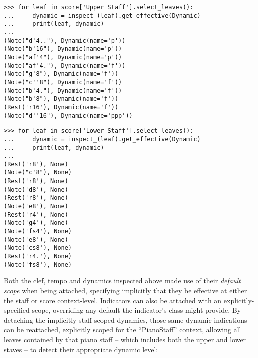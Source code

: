 \begin{comment}
<abjad>
for leaf in score['Upper Staff'].select_leaves():
    dynamic = inspect_(leaf).get_effective(Dynamic)
    print(leaf, dynamic)

for leaf in score['Lower Staff'].select_leaves():
    dynamic = inspect_(leaf).get_effective(Dynamic)
    print(leaf, dynamic)

</abjad>
\end{comment}

\begin{abjadbookoutput}
\begin{singlespacing}
\vspace{-0.5\baselineskip}
\begin{verbatim}
>>> for leaf in score['Upper Staff'].select_leaves():
...     dynamic = inspect_(leaf).get_effective(Dynamic)
...     print(leaf, dynamic)
...
(Note("d'4.."), Dynamic(name='p'))
(Note("b'16"), Dynamic(name='p'))
(Note("af'4"), Dynamic(name='p'))
(Note("af'4."), Dynamic(name='f'))
(Note("g'8"), Dynamic(name='f'))
(Note("c''8"), Dynamic(name='f'))
(Note("b'4."), Dynamic(name='f'))
(Note("b'8"), Dynamic(name='f'))
(Rest('r16'), Dynamic(name='f'))
(Note("d''16"), Dynamic(name='ppp'))
\end{verbatim}
\begin{verbatim}
>>> for leaf in score['Lower Staff'].select_leaves():
...     dynamic = inspect_(leaf).get_effective(Dynamic)
...     print(leaf, dynamic)
...
(Rest('r8'), None)
(Note("c'8"), None)
(Rest('r8'), None)
(Note('d8'), None)
(Rest('r8'), None)
(Note('e8'), None)
(Rest('r4'), None)
(Note('g4'), None)
(Note('fs4'), None)
(Note('e8'), None)
(Note('cs8'), None)
(Rest('r4.'), None)
(Note('fs8'), None)
\end{verbatim}
\end{singlespacing}
\end{abjadbookoutput}

\noindent Both the clef, tempo and dynamics inspected above made use of their
\emph{default scope} when being attached, specifying implicitly that they be
effective at either the staff or score context-level. Indicators can also be
attached with an explicitly-specified scope, overriding any default the
indicator's class might provide. By detaching the implicitly-staff-scoped
dynamics, those same dynamic indications can be reattached, explicitly scoped
for the \enquote{PianoStaff} context, allowing all leaves contained by that
piano staff -- which includes both the upper and lower staves -- to detect
their appropriate dynamic level:


